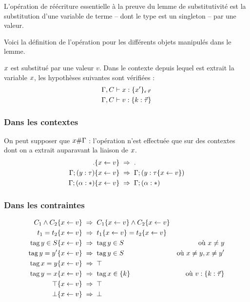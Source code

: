 L'opération de réécriture essentielle à la preuve du lemme de substitutivité
est la substitution d'une variable de terme -- dont le type est un singleton --
par une valeur.

Voici la définition de l'opération pour les différents objets manipulés dans le
lemme.

$x$ est substitué par une valeur $v$.
Dans le contexte depuis lequel est extrait la variable $x$, les hypothèses
suivantes sont vérifiées :
%
\begin{align*}
  &\Gamma, C \vdash x : \{x'\}_{\epsilon \, \vec{\tau}} \\
  &\Gamma, C \vdash v : \{k : \vec{\tau}\}
\end{align*}
%
\subsubsection{Dans les contextes}
On peut supposer que $x \# \Gamma$ : l'opération n'est effectuée que sur
des contextes dont on a extrait auparavant la liaison de $x$.
\begin{align*}
                            . \{x \leftarrow v\} \;&\Rightarrow\; . \\
     \Gamma; (y : \tau) \{x \leftarrow v\} \;&\Rightarrow\; \Gamma; (y : \tau \{x \leftarrow v\}) \\
  \Gamma; (\alpha : *) \{x \leftarrow v\} \;&\Rightarrow\; \Gamma; (\alpha : *) 
\end{align*}

\subsubsection{Dans les contraintes}
\begin{align*}
         C_1 \wedge C_2 \{x \leftarrow v\} \;&\Rightarrow\; C_1 \{x \leftarrow v\} \wedge C_2 \{x \leftarrow v\}  \\
    t_1 = t_2 \{x \leftarrow v\} \;&\Rightarrow\; t_1\{x \leftarrow v\} = t_2\{x \leftarrow v\} \\
    \operatorname{tag} y    \in S \{x \leftarrow v\} \;&\Rightarrow\; \operatorname{tag} y \in S & \text{où } x \neq y \\
    \operatorname{tag} y    =  y' \{x \leftarrow v\} \;&\Rightarrow\; \operatorname{tag} y \in S & \text{où } x \neq y, x \neq y' \\
    \operatorname{tag} x    =  y  \{x \leftarrow v\} \;&\Rightarrow\; \top \\
    \operatorname{tag} y    =  x  \{x \leftarrow v\} \;&\Rightarrow\; \operatorname{tag} x \in \{k\} & \text{où } v : \{k : \vec{\tau} \} \\
                 \top \{x \leftarrow v\} \;&\Rightarrow\; \top \\
                 \bot \{x \leftarrow v\} \;&\Rightarrow\; \bot
\end{align*}

